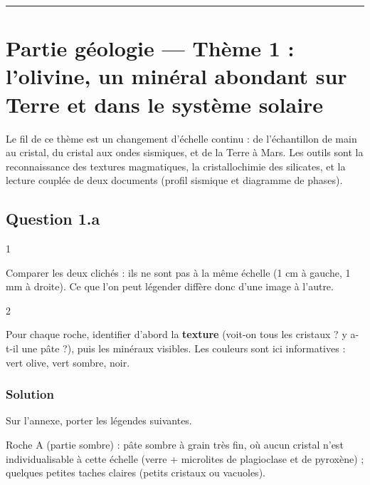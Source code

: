 \documentclass[11pt,a4paper]{article}
\begin{document}
\begin{center}\rule{0.5\linewidth}{0.5pt}\end{center}

\hypertarget{partie-guxe9ologie-thuxe8me-1-lolivine-un-minuxe9ral-abondant-sur-terre-et-dans-le-systuxe8me-solaire}{%
\section{Partie géologie --- Thème 1 : l'olivine, un minéral abondant sur Terre et dans le système solaire}\label{partie-guxe9ologie-thuxe8me-1-lolivine-un-minuxe9ral-abondant-sur-terre-et-dans-le-systuxe8me-solaire}}

Le fil de ce thème est un changement d'échelle continu : de l'échantillon de main au cristal, du cristal aux ondes sismiques, et de la Terre à Mars. Les outils sont la reconnaissance des textures magmatiques, la cristallochimie des silicates, et la lecture couplée de deux documents (profil sismique et diagramme de phases).

\hypertarget{question-1.a}{%
\subsection{Question 1.a}\label{question-1.a}}

\begin{indication}{1}

Comparer les deux clichés : ils ne sont pas à la même échelle (1 cm à gauche, 1 mm à droite). Ce que l'on peut légender diffère donc d'une image à l'autre.

\end{indication}

\begin{indication}{2}

Pour chaque roche, identifier d'abord la \textbf{texture} (voit-on tous les cristaux ? y a-t-il une pâte ?), puis les minéraux visibles. Les couleurs sont ici informatives : vert olive, vert sombre, noir.

\end{indication}

\hypertarget{solution}{%
\subsubsection{Solution}\label{solution}}

Sur l'annexe, porter les légendes suivantes.

Roche A (partie sombre) : pâte sombre à grain très fin, où aucun cristal n'est individualisable à cette échelle (verre + microlites de plagioclase et de pyroxène) ; quelques petites taches claires (petits cristaux ou vacuoles).
\end{document}
